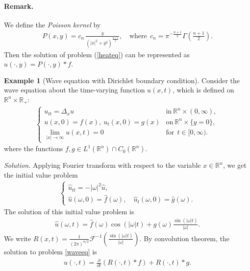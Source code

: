 \documentclass{article}
\numberwithin{equation}{section}
\newcommand{\bbR}{\mathbb{R}}
\renewcommand{\cal}{\mathcal}
\newcommand{\wh}{\widehat}
\theoremstyle{plain}
\theoremstyle{definition}
\newtheorem{example}[theorem]{Example}
\begin{document}
\paragraph{Remark.} We define the \textit{Poisson kernel} by \vspace{-0.1cm}
\begin{align*}
	P(x,y)=c_n\,\frac{y}{\left(\vert x\vert^2+y^2\right)^{\frac{n+1}{2}}},\quad\text{where}\ \ c_n=\pi^{-\frac{n+1}{2}}\Gamma\left(\frac{n+1}{2}\right).
\end{align*}
Then the solution of problem (\ref{heateq}) can be represented as $u(\cdot,y)=P(\cdot, y)*f$.

\begin{example}[Wave equation with Dirichlet boundary condition]
Consider the wave equation about the time-varying function $u(x,t)$, which is defined on $\bbR^n\times\bbR_+$:
\begin{align}
	\begin{cases}
		u_{tt}=\Delta_x u & \mathrm{in}\ \bbR^n\times(0,\infty),\\
		u(x,0)=f(x),\ u_t(x,0)=g(x)& \mathrm{on}\ \bbR^n\times\{y=0\},\\
		\lim_{\vert x\vert\to\infty}u(x,t)=0& \mathrm{for}\ \ t\in[0,\infty).
	\end{cases}\label{waveeq}
\end{align}
where the functions $f,g\in L^1(\bbR^n)\cap C_0(\bbR^n)$.
\end{example}

\textit{\hspace{-1.5em}Solution.} Applying Fourier transform with respect to the variable $x\in\bbR^n$, we get the initial value problem\vspace{-0.1cm}
\begin{align*}
	\begin{cases}
		\wh{u}_{tt}=-\vert\omega\vert^2\wh{u},\\
		\wh{u}(\omega,0)=\wh{f}(\omega),\quad\wh{u}_t(\omega,0)=\wh{g}(\omega).
	\end{cases}
\end{align*}
The solution of this initial value problem is \vspace{-0.1cm}
\begin{align*}
	\wh{u}(\omega,t)=\wh{f}(\omega)\cos(\vert\omega\vert t)+\wh{g}(\omega)\frac{\sin(\vert\omega\vert t)}{\vert\omega\vert}.
\end{align*}
We write $R(x,t)=\frac{1}{(2\pi)^{n/2}}\cal{F}^{-1}\left(\frac{\sin(\vert\omega\vert t)}{\vert\omega\vert}\right).$ By convolution theorem, the solution to problem \ref{waveeq} is \vspace{-0.1cm}
\begin{align*}
	u(\cdot,t)=\frac{\partial}{\partial t}\left(R(\cdot,t)*f\right)+R(\cdot,t)*g.\tag*{\qed}
\end{align*}
\end{document}
